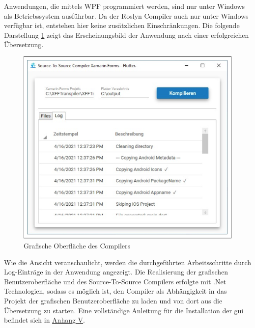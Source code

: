 Anwendungen,  die mittels WPF programmiert werden, sind nur unter Windows als Betriebssystem ausführbar.  Da der Roslyn Compiler auch nur unter Windows verfügbar ist,  entstehen hier keine zusätzlichen Einschränkungen.  Die folgende Darstellung \ref{fig:CompilerUI} zeigt das Erscheinungsbild der Anwendung nach einer erfolgreichen Übersetzung.
\newpage
\begin{figure}[!ht]
 \includegraphics[width=\textwidth,keepaspectratio]{Images/Implementation/UiScreenshot.png}
 \caption{Grafische Oberfläche des Compilers}
 \label{fig:CompilerUI}
\end{figure}

Wie die Ansicht veranschaulicht, werden die durchgeführten Arbeitsschritte durch Log-Einträge in der Anwendung angezeigt.
Die Realisierung der grafischen Benutzeroberfläche 
und des Source-To-Source Compilers erfolgte mit  .Net Technologien,  sodass es möglich ist,  den Compiler als Abhängigkeit in das Projekt der grafischen Benutzeroberfläche zu laden und von dort aus die Übersetzung zu starten.  Eine vollständige Anleitung für die Installation der \ac{gui}  befindet sich in  \hyperref[chap:Installationsanleitung]{Anhang V}.